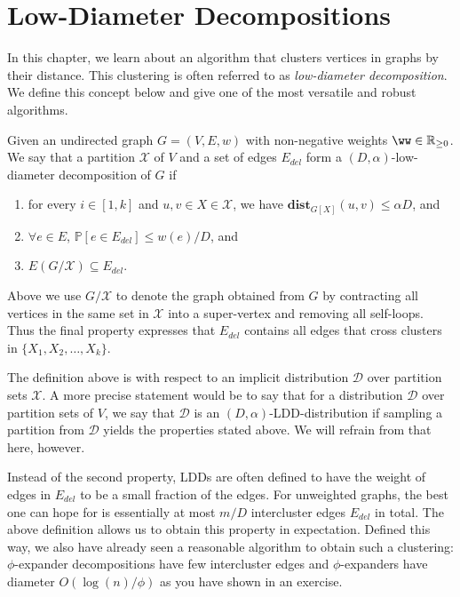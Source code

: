 
\chapter{Low-Diameter Decompositions}

In this chapter, we learn about an algorithm that clusters vertices in graphs by their distance. This clustering is often referred to as \emph{low-diameter decomposition}. We define this concept below and give one of the most versatile and robust algorithms.

\begin{definition}
Given an undirected graph $G = (V,E,w)$ with non-negative weights $\ww \in \mathbb{R}_{\geq 0}$. We say that a partition $\mathcal{X}$ of $V$ and a set of edges $E_{del}$ form a $(D, \alpha)$-low-diameter decomposition of $G$ if
\begin{enumerate}
\item for every $i \in [1, k]$ and $u,v \in X \in \mathcal{X}$, we have $\mathbf{dist}_{G[X]}(u,v) \leq \alpha D$, and
\item $\forall e \in E$, $\mathbb{P}[e \in E_{del}] \leq w(e)/ D$, and
\item $E(G / \mathcal{X}) \subseteq E_{del}$. 
\end{enumerate}
\end{definition}
Above we use $G / \mathcal{X}$ to denote the graph obtained from $G$ by contracting all vertices in the same set in $\mathcal{X}$ into a super-vertex and removing all self-loops. Thus the final property expresses that $E_{del}$ contains all edges that cross clusters in $\{X_1, X_2, \ldots, X_k\}$.

\begin{remark}
The definition above is with respect to an implicit distribution $\mathcal{D}$ over partition sets $\mathcal{X}$. A more precise statement would be to say that for a distribution $\mathcal{D}$ over partition sets of $V$, we say that $\mathcal{D}$ is an $(D, \alpha)$-LDD-distribution if sampling a partition from $\mathcal{D}$ yields the properties stated above. We will refrain from that here, however.
\end{remark}
\begin{remark}
Instead of the second property, LDDs are often defined to have the weight of edges in $E_{del}$ to be a small fraction of the edges. For unweighted graphs, the best one can hope for is essentially at most $m/D$ intercluster edges $E_{del}$ in total. The above definition allows us to obtain this property in expectation. Defined this way, we also have already seen a reasonable algorithm to obtain such a clustering: $\phi$-expander decompositions have few intercluster edges and $\phi$-expanders have diameter $O(\log(n)/\phi)$ as you have shown in an exercise.
\end{remark}

